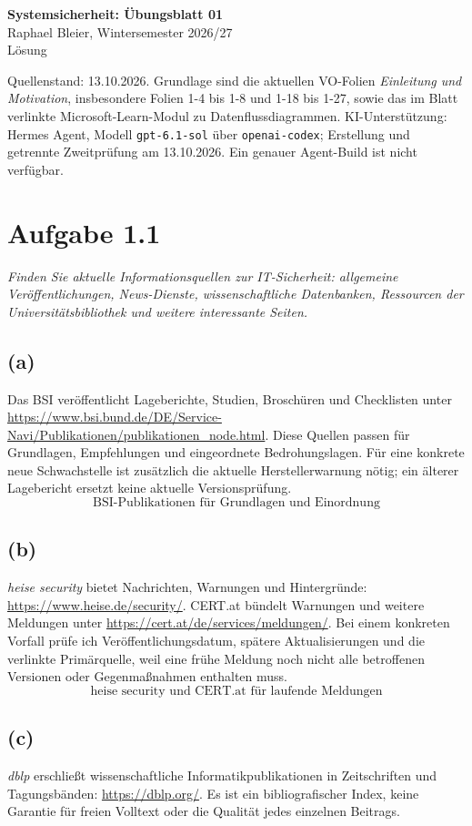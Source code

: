 \documentclass[a4paper,11pt]{article}
\newif\ifexplain
\newcommand{\aufgabe}[1]{\section*{Aufgabe #1}}
\newcommand{\angabe}[1]{\textit{#1}\par\smallskip}
\newcommand{\teil}[1]{\subsection*{(#1)}}
\newcommand{\explain}[1]{\ifexplain\begin{erklbox}#1\end{erklbox}\fi}
\newcommand{\ergebnis}[1]{\[\boxed{\text{#1}}\]}
\begin{document}
\begin{center}
{\Large\bfseries Systemsicherheit: Übungsblatt 01}\\
Raphael Bleier, Wintersemester 2026/27\\
\ifexplain Erklärung\else Lösung\fi
\end{center}
\smallskip
Quellenstand: 13.10.2026. Grundlage sind die aktuellen VO-Folien
\emph{Einleitung und Motivation}, insbesondere Folien 1-4 bis 1-8 und 1-18 bis 1-27,
sowie das im Blatt verlinkte Microsoft-Learn-Modul zu Datenflussdiagrammen.
KI-Unterstützung: Hermes Agent, Modell \texttt{gpt-6.1-sol} über \texttt{openai-codex};
Erstellung und getrennte Zweitprüfung am 13.10.2026. Ein genauer Agent-Build ist nicht verfügbar.

\aufgabe{1.1}
\angabe{Finden Sie aktuelle Informationsquellen zur IT-Sicherheit: allgemeine Veröffentlichungen,
News-Dienste, wissenschaftliche Datenbanken, Ressourcen der Universitätsbibliothek und weitere interessante Seiten.}
\teil{a}
Das BSI veröffentlicht Lageberichte, Studien, Broschüren und Checklisten unter
\url{https://www.bsi.bund.de/DE/Service-Navi/Publikationen/publikationen_node.html}.
Diese Quellen passen für Grundlagen, Empfehlungen und eingeordnete Bedrohungslagen.
Für eine konkrete neue Schwachstelle ist zusätzlich die aktuelle Herstellerwarnung nötig;
ein älterer Lagebericht ersetzt keine aktuelle Versionsprüfung.
\ergebnis{BSI-Publikationen für Grundlagen und Einordnung}
\explain{Hier trennen wir Hintergrundwissen von einer akuten Warnung. Ein Bericht kann gut erklären,
warum eine Gefahr wichtig ist, während ein Hersteller-Advisory die betroffenen Versionen und die Abhilfe nennt.}
\teil{b}
\emph{heise security} bietet Nachrichten, Warnungen und Hintergründe:
\url{https://www.heise.de/security/}.
CERT.at bündelt Warnungen und weitere Meldungen unter
\url{https://cert.at/de/services/meldungen/}.
Bei einem konkreten Vorfall prüfe ich Veröffentlichungsdatum, spätere Aktualisierungen und die verlinkte Primärquelle,
weil eine frühe Meldung noch nicht alle betroffenen Versionen oder Gegenmaßnahmen enthalten muss.
\ergebnis{heise security und CERT.at für laufende Meldungen}
\explain{Eine Meldung ist der Einstieg, nicht das Ende der Prüfung. Besonders bei Sicherheitsupdates
zählt, ob die eigene Version betroffen ist und ob inzwischen ein korrigiertes Advisory erschienen ist.}
\teil{c}
\emph{dblp} erschließt wissenschaftliche Informatikpublikationen in Zeitschriften und Tagungsbänden:
\url{https://dblp.org/}.
Es ist ein bibliografischer Index, keine Garantie für freien Volltext oder die Qualität jedes einzelnen Beitrags.
\end{document}
